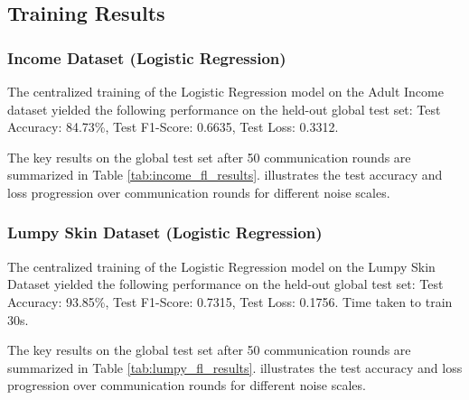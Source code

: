 \documentclass[10pt,twocolumn]{article}
\begin{document}
\subsection{Training Results}
\subsubsection{Income Dataset (Logistic Regression)}
The centralized training of the Logistic Regression model on the Adult Income dataset yielded the following performance on the held-out global test set: Test Accuracy: 84.73\%, Test F1-Score: 0.6635, Test Loss: 0.3312. 

The key results on the global test set after 50 communication rounds are summarized in Table \ref{tab:income_fl_results}. illustrates the test accuracy and loss progression over communication rounds for different noise scales.

\begin{table}[hbtp]
  \centering
  \caption{FL Performance on Adult Income Dataset (50 Rounds)}
  \label{tab:income_fl_results}
\end{table}

\subsubsection{Lumpy Skin Dataset (Logistic Regression)}
The centralized training of the Logistic Regression model on the Lumpy Skin Dataset yielded the following performance on the held-out global test set: Test Accuracy: 93.85\%, Test F1-Score: 0.7315, Test Loss: 0.1756. Time taken to train 30s. 

The key results on the global test set after 50 communication rounds are summarized in Table \ref{tab:lumpy_fl_results}. illustrates the test accuracy and loss progression over communication rounds for different noise scales.
\end{document}
